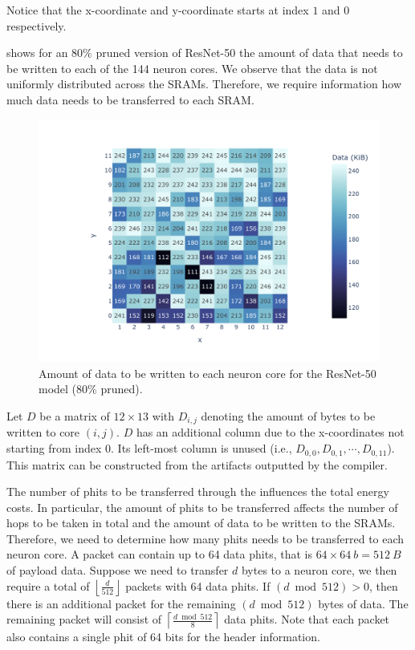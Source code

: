 Notice that the x-coordinate and y-coordinate starts at index $1$ and $0$ respectively.

 shows for an $80\%$ pruned version of ResNet-50 the amount of data that needs to be written to each of the 144 neuron cores.
We observe that the data is not uniformly distributed across the SRAMs.
Therefore, we require information how much data needs to be transferred to each SRAM.

\begin{figure}[hbtp]
    \centering
    \includegraphics[clip, trim=80 20 10 30, width=0.8\linewidth]{assets/resnet50_coredata_heatmap.pdf}
    \caption{Amount of data to be written to each neuron core for the ResNet-50 model (80\% pruned).}
    \label{fig:model_data_heapmap}
\end{figure}

Let $D$ be a matrix of $12 \times 13$ with $D_{i,j}$ denoting the amount of bytes to be written to core $\left( i,j \right)$.
$D$ has an additional column due to the x-coordinates not starting from index $0$.
Its left-most column is unused (i.e., $D_{0,0}, D_{0,1}, \cdots, D_{0,11}$).
This matrix can be constructed from the artifacts outputted by the compiler.

The number of phits to be transferred through the \confignoc{} influences the total energy costs.
In particular, the amount of phits to be transferred affects the number of hops to be taken in total and the amount of data to be written to the SRAMs.
Therefore, we need to determine how many phits needs to be transferred to each neuron core.
A packet can contain up to 64 data phits, that is $64 \times \SI{64}{b} = \SI{512}{B}$ of payload data.
Suppose we need to transfer $d$ bytes to a neuron core, we then require a total of $\left\lfloor \frac{d}{512} \right\rfloor$ packets with 64 data phits.
If $\left( d \bmod 512 \right) > 0$, then there is an additional packet for the remaining $\left( d \bmod 512 \right)$ bytes of data.
The remaining packet will consist of $\left\lceil \frac{d \bmod 512}{8}\right\rceil$ data phits.
Note that each packet also contains a single phit of 64 bits for the header information.

